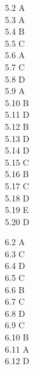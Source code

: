 \documentclass[a4paper,10pt,fleqn,twoside]{article}
\begin{document}
\begin{multicols}{4}
5.2 A\\
5.3 A\\
5.4 B\\
5.5 C\\
5.6 A\\
5.7 C\\
5.8 D\\
5.9 A\\
5.10 B\\
5.11 D\\
5.12 B\\
5.13 D\\
5.14 D\\
5.15 C\\
5.16 B\\
5.17 C\\
5.18 D\\
5.19 E\\
5.20 D\\
\end{multicols}

\begin{multicols}{4}
6.2 A\\
6.3 C\\
6.4 D\\
6.5 C\\
6.6 B\\
6.7 C\\
6.8 D\\
6.9 C\\
6.10 B\\
6.11 A\\
6.12 D
\end{multicols}
\fi
\end{document}
